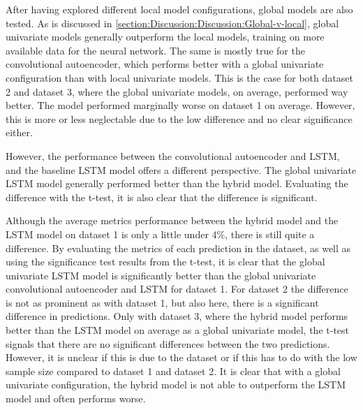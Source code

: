 After having explored different local model configurations,
global models are also tested.
As is discussed in \cref{section:Discussion:Discussion:Global-v-local},
global univariate models generally outperform the local models, training on more available data for the neural network.
The same is mostly true for the convolutional autoencoder, which performs better with a global univariate configuration than with local univariate models.
This is the case for both dataset 2 and dataset 3, where the global univariate models, on average, performed way better.
The model performed marginally worse on dataset 1 on average. However, this is more or less neglectable due to the low difference and no clear significance either.

However, the performance between the convolutional autoencoder and LSTM, and the baseline LSTM model offers a different perspective.
The global univariate LSTM model generally performed better than the hybrid model.
Evaluating the difference with the t-test, it is also clear that the difference is significant.

Although the average metrics performance between the hybrid model and the LSTM model on dataset 1 is only a little under 4\%,
there is still quite a difference.
By evaluating the metrics of each prediction in the dataset, as well as using the significance test results from the t-test,
it is clear that the global univariate LSTM model is significantly better than the global univariate convolutional autoencoder and LSTM for dataset 1.
For dataset 2 the difference is not as prominent as with dataset 1, but also here, there is a significant difference in predictions.
Only with dataset 3, where the hybrid model performs better than the LSTM model on average as a global univariate model,
the t-test signals that there are no significant differences between the two predictions.
However, it is unclear if this is due to the dataset or if this has to do with the low sample size compared to dataset 1 and dataset 2.
It is clear that with a global univariate configuration, the hybrid model is not able to outperform the LSTM model and often performs worse.


